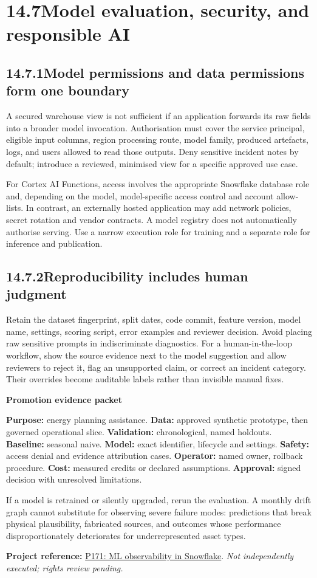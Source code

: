 \documentclass[11pt,twoside]{article}
\newcommand{\topic}[2]{\subsection*{#1\quad #2}}
\newcommand{\repo}[2]{\par\begingroup\fontsize{8.0}{9.6}\selectfont\sffamily\color{inkgray}\textbf{Project reference:} \href{#2}{#1}. \textit{Not independently executed; rights review pending.}\par\endgroup}
\begin{document}
\newpage

\section*{14.7\quad Model evaluation, security, and responsible AI}
\topic{14.7.1}{Model permissions and data permissions form one boundary}
A secured warehouse view is not sufficient if an application forwards its raw fields into a broader model invocation. Authorisation must cover the service principal, eligible input columns, region processing route, model family, produced artefacts, logs, and users allowed to read those outputs. Deny sensitive incident notes by default; introduce a reviewed, minimised view for a specific approved use case.

For Cortex AI Functions, access involves the appropriate Snowflake database role and, depending on the model, model-specific access control and account allow-lists. In contrast, an externally hosted application may add network policies, secret rotation and vendor contracts. A model registry does not automatically authorise serving. Use a narrow execution role for training and a separate role for inference and publication.
\topic{14.7.2}{Reproducibility includes human judgment}
Retain the dataset fingerprint, split dates, code commit, feature version, model name, settings, scoring script, error examples and reviewer decision. Avoid placing raw sensitive prompts in indiscriminate diagnostics. For a human-in-the-loop workflow, show the source evidence next to the model suggestion and allow reviewers to reject it, flag an unsupported claim, or correct an incident category. Their overrides become auditable labels rather than invisible manual fixes.
\begin{whitebox}\textbf{Promotion evidence packet}\par
\textbf{Purpose:} energy planning assistance. \textbf{Data:} approved synthetic prototype, then governed operational slice. \textbf{Validation:} chronological, named holdouts. \textbf{Baseline:} seasonal naive. \textbf{Model:} exact identifier, lifecycle and settings. \textbf{Safety:} access denial and evidence attribution cases. \textbf{Operator:} named owner, rollback procedure. \textbf{Cost:} measured credits or declared assumptions. \textbf{Approval:} signed decision with unresolved limitations.
\end{whitebox}
If a model is retrained or silently upgraded, rerun the evaluation. A monthly drift graph cannot substitute for observing severe failure modes: predictions that break physical plausibility, fabricated sources, and outcomes whose performance disproportionately deteriorates for underrepresented asset types.
\repo{P171: ML observability in Snowflake}{https://github.com/Snowflake-Labs/sfguide-getting-started-with-ml-observability-in-snowflake}
\end{document}
